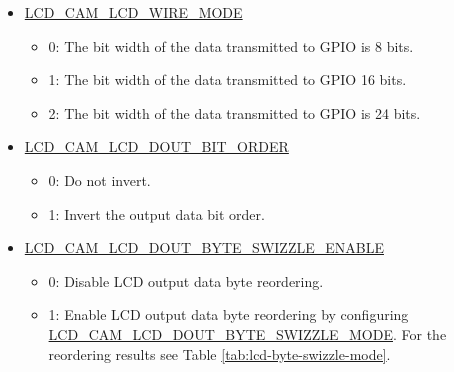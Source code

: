 \documentclass[main\_\_EN.tex]{subfiles}
\begin{document}
\begin{itemize}
    \item \hyperref[fielddesc:LCDCAMLCDWIREMODE]{LCD\_CAM\_LCD\_WIRE\_MODE}
    \begin{itemize}
        \item 0: The bit width of the data transmitted to GPIO is 8 bits.
        \item 1: The bit width of the data transmitted to GPIO 16 bits.
        \item 2: The bit width of the data transmitted to GPIO is 24 bits.
    \end{itemize}
    \item \hyperref[fielddesc:LCDCAMLCDDOUTBITORDER]{LCD\_CAM\_LCD\_DOUT\_BIT\_ORDER}
    \begin{itemize}
        \item 0: Do not invert.
        \item 1: Invert the output data bit order.
    \end{itemize}
    \item \hyperref[fielddesc:LCDCAMLCDDOUTBYTESWIZZLEENABLE]{LCD\_CAM\_LCD\_DOUT\_BYTE\_SWIZZLE\_ENABLE}
    \begin{itemize}
        \item 0: Disable LCD output data byte reordering.
        \item 1: Enable LCD output data byte reordering by configuring \hyperref[fielddesc:LCDCAMLCDDOUTBYTESWIZZLEMODE]{LCD\_CAM\_LCD\_DOUT\_BYTE\_SWIZZLE\_MODE}. For the reordering results see Table \ref{tab:lcd-byte-swizzle-mode}.
    \end{itemize}
\end{itemize}
\end{document}

